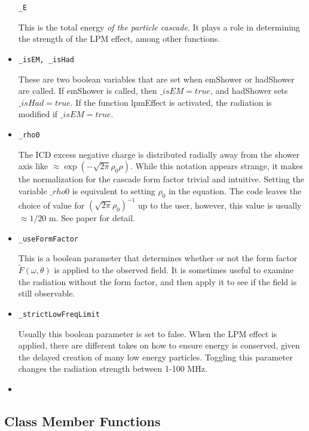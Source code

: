 \documentclass[10pt]{article}
\begin{document}
\begin{itemize}
\begin{verbatim}
_E
\end{verbatim}
This is the total energy \textit{of the particle cascade}.  It plays a role in determining the strength of the LPM effect, among other functions.
\item \begin{verbatim}
_isEM, _isHad
\end{verbatim}
These are two boolean variables that are set when emShower or hadShower are called.  If emShower is called, then $\_isEM = true$, and hadShower sets $\_isHad = true$.  If the function lpmEffect is activated, the radiation is modified if $\_isEM = true$.
\item \begin{verbatim}
_rho0
\end{verbatim}
The ICD excess negative charge is distributed radially away from the shower axis like $\approx \exp(-\sqrt{2\pi}\rho_0 \rho)$.  While this notation appears strange, it makes the normalization for the cascade form factor trivial and intuitive.  Setting the variable $\_rho0$ is equivalent to setting $\rho_0$ in the equation.  The code leaves the choice of value for $(\sqrt{2\pi} \rho_0)^{-1}$ up to the user, however, this value is usually $\approx 1/20$ m.  See paper for detail.
\item \begin{verbatim}
_useFormFactor
\end{verbatim}
This is a boolean parameter that determines whether or not the form factor $\widetilde{F}(\omega,\theta)$ is applied to the observed field.  It is sometimes useful to examine the radiation without the form factor, and then apply it to see if the field is still observable.
\item \begin{verbatim}
_strictLowFreqLimit
\end{verbatim}
Usually this boolean parameter is set to false.  When the LPM effect is applied, there are different takes on how to ensure energy is conserved, given the delayed creation of many low energy particles.  Toggling this parameter changes the radiation strength between 1-100 MHz.
\item \begin{verbatim}
\end{verbatim}
\end{itemize}

\subsection{Class Member Functions}
\end{document}
